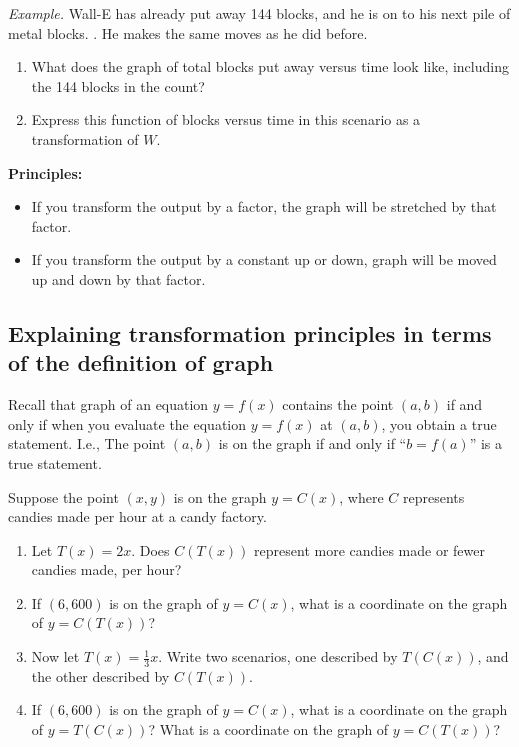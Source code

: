 \documentclass[11pt]{article}
\newenvironment{task}
	{\begin{mdframed}[linecolor=lightgray, linewidth=3pt]\raggedright}
	{\end{mdframed}}
\theoremstyle{definition}
\begin{document}
{\it Example.} Wall-E has already put away 144 blocks, and he is on to his next pile of metal blocks. .  He makes the same moves as he did before. 
\begin{enumerate}[label=(\alph*)]
\item What does the graph of total blocks put away versus time look like, including the 144 blocks in the count?
\item Express this function of blocks versus time in this scenario as a transformation of $W$.
\end{enumerate}

{\bf Principles:} 
	\begin{itemize}
	\item If you transform the output by a factor, the graph will be stretched by that factor. 
	\item If you transform the output by a constant up or down, graph will be moved up and down by that factor.
	\end{itemize}

\subsection{Explaining transformation principles in terms of the definition of graph}

Recall that graph of an equation $y=f(x)$ contains the point $(a,b)$ if and only if when you evaluate the equation $y=f(x)$ at $(a, b)$, you obtain a true statement. I.e., The point $(a,b)$ is on the graph if and only if ``$b=f(a)$'' is a true statement. 

\begin{task}
Suppose the point $(x,y)$ is on the graph $y=C(x)$, where $C$ represents candies made per hour at a candy factory. 

\begin{enumerate}[label=(\alph*)]
\item Let $T(x)=2x$. Does $C(T(x))$ represent more candies made or fewer candies made, per hour? 
\item If $(6,600)$ is on the graph of $y=C(x)$, what is a coordinate on the graph of $y=C(T(x))$?
\item Now let $T(x)=\frac{1}{3}x$. Write two scenarios, one described by $T(C(x))$, and the other described by $C(T(x))$.
\item If $(6,600)$ is on the graph of $y=C(x)$, what is a coordinate on the graph of $y=T(C(x))$? What is a coordinate on the graph of $y=C(T(x))$?
\end{enumerate}
\end{task}
\end{document}
